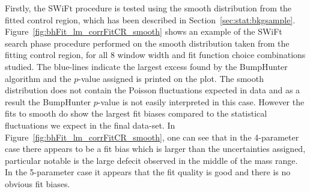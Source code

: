 Firstly, the SWiFt procedure is tested using the smooth distribution from the fitted control region,
which has been described in Section~\ref{sec:stat:bkgsample}.
Figure~\ref{fig:bhFit_lm_corrFitCR_smooth} shows an example of the SWiFt search phase procedure
performed on the smooth distribution taken from the fitting control region,
for all 8 window width and fit function choice combinations studied.
The blue-lines indicate the largest excess found by the {\sc BumpHunter} algorithm and the $p$-value assigned is printed on the plot. 
The smooth distribution does not contain the Poisson fluctuations expected in data
and as a result the {\sc BumpHunter} $p$-value is not easily interpreted in this case.
However the fits to smooth do show the largest fit biases compared to the statistical fluctuations we expect in the final data-set.
In Figure~\ref{fig:bhFit_lm_corrFitCR_smooth},
one can see that in the 4-parameter case there appears to be a fit bias which is larger than the uncertainties assigned,
particular notable is the large defecit observed in the middle of the mass range.
In the 5-parameter case it appears that the fit quality is good and there is no obvious fit biases.\\


